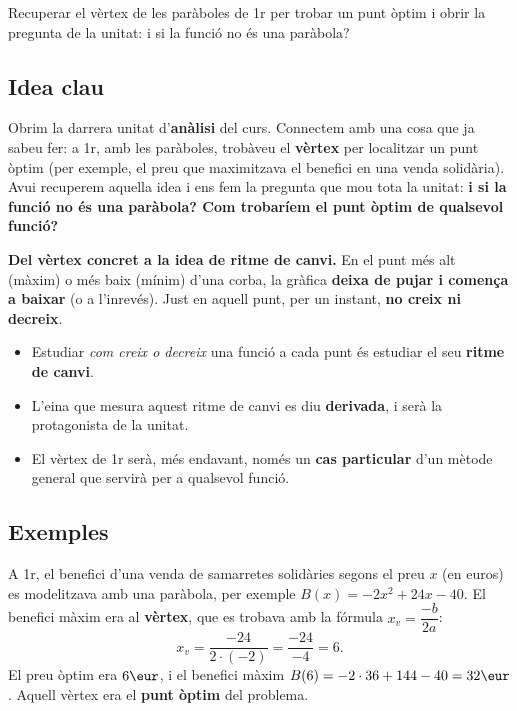 %
{Recuperar el vèrtex de les paràboles de 1r per trobar un punt òptim i obrir la pregunta de la unitat: i si la funció no és una paràbola?}

\subsection{Idea clau}

Obrim la darrera unitat d'\textbf{anàlisi} del curs. Connectem amb una cosa que ja
sabeu fer: a 1r, amb les paràboles, trobàveu el \textbf{vèrtex} per localitzar un punt
òptim (per exemple, el preu que maximitzava el benefici en una venda solidària). Avui
recuperem aquella idea i ens fem la pregunta que mou tota la unitat: \textbf{i si la
funció no és una paràbola? Com trobaríem el punt òptim de qualsevol funció?}

\begin{idea}
\textbf{Del vèrtex concret a la idea de ritme de canvi.} En el punt més alt (màxim) o
més baix (mínim) d'una corba, la gràfica \textbf{deixa de pujar i comença a baixar}
(o a l'inrevés). Just en aquell punt, per un instant, \textbf{no creix ni decreix}.
\begin{itemize}[leftmargin=1.4em, itemsep=2pt]
  \item Estudiar \emph{com creix o decreix} una funció a cada punt és estudiar el seu
        \textbf{ritme de canvi}.
  \item L'eina que mesura aquest ritme de canvi es diu \textbf{derivada}, i serà la
        protagonista de la unitat.
  \item El vèrtex de 1r serà, més endavant, només un \textbf{cas particular} d'un
        mètode general que servirà per a qualsevol funció.
\end{itemize}
\end{idea}

\subsection{Exemples}

\begin{exemple}
A 1r, el benefici d'una venda de samarretes solidàries segons el preu $x$ (en euros)
es modelitzava amb una paràbola, per exemple $B(x)=-2x^2+24x-40$. El benefici màxim
era al \textbf{vèrtex}, que es trobava amb la fórmula $x_v=\dfrac{-b}{2a}$:
\[
x_v=\frac{-24}{2\cdot(-2)}=\frac{-24}{-4}=6.
\]
El preu òptim era $6\eur$, i el benefici màxim $B(6)=-2\cdot 36+144-40=32\eur$. Aquell
vèrtex era el \textbf{punt òptim} del problema.
\end{exemple}

